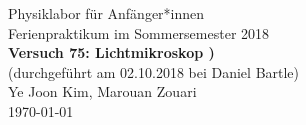 \documentclass[11pt,a4paper]{article}
\begin{document}
{
	\centering
	\large
	Physiklabor für Anfänger*innen \\
	Ferienpraktikum im Sommersemester 2018 \\[4mm]
	\textbf{\LARGE 
		Versuch 75: Lichtmikroskop
		)} \\[3mm]
	(durchgeführt am 02.10.2018 bei Daniel Bartle) \\
	Ye Joon Kim, Marouan Zouari\\
	\today \\[10mm]
}
\end{document}
